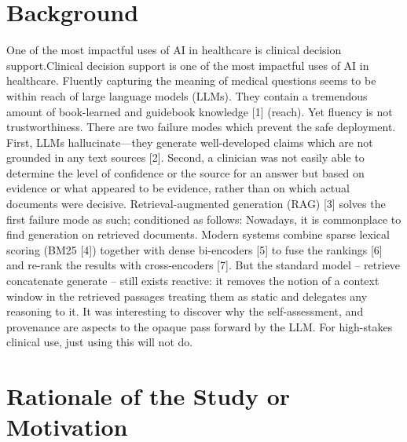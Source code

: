 \section{Background}

One of the most impactful uses of AI in healthcare is clinical decision support.Clinical decision support is one of the most impactful uses of AI in healthcare. Fluently capturing the meaning of medical questions seems to be within reach of large language models (LLMs). They contain a tremendous amount of book-learned and guidebook knowledge [1] (reach). Yet fluency is not trustworthiness. There are two failure modes which prevent the safe deployment. First, LLMs hallucinate—they generate well-developed claims which are not grounded in any text sources [2]. Second, a clinician was not easily able to determine the level of confidence or the source for an answer but based on evidence or what appeared to be evidence, rather than on which actual documents were decisive.
Retrieval-augmented generation (RAG) [3] solves the first failure mode as such; conditioned as follows: Nowadays, it is commonplace to find generation on retrieved documents. Modern systems combine sparse lexical scoring (BM25 [4]) together with dense bi-encoders [5] to fuse the rankings [6] and re-rank the results with cross-encoders [7]. But the standard model -- retrieve concatenate generate -- still exists reactive: it removes the notion of a context window in the retrieved passages treating them as static and delegates any reasoning to it. It was interesting to discover why the self-assessment, and provenance are aspects to the opaque pass forward by the LLM. For high-stakes clinical use, just using this will not do.


\section{Rationale of the Study or Motivation}

